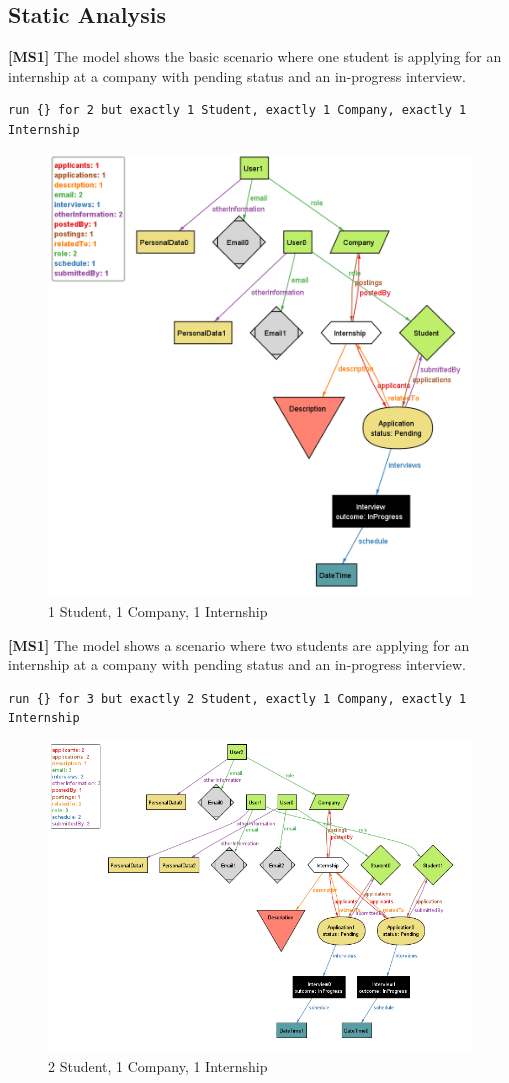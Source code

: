 \subsection{Static Analysis}
\textbf{[MS1]} The model shows the basic scenario where one student is applying for an internship at a company with pending status and an in-progress interview.
\begin{lstlisting}
run {} for 2 but exactly 1 Student, exactly 1 Company, exactly 1  Internship
\end{lstlisting}
\begin{figure}[H]
    \centering
    \includegraphics[width=0.75\linewidth]{RASD//Images/1st1com.png}
    \caption{1 Student, 1 Company, 1 Internship}
    \label{fig:enter-label}
\end{figure}

\textbf{[MS1]} The model shows a scenario where two students are applying for an internship at a company with pending status and an in-progress interview.
\begin{lstlisting}
run {} for 3 but exactly 2 Student, exactly 1 Company, exactly 1  Internship
\end{lstlisting}
\begin{figure}[H]
    \centering
    \includegraphics[width=0.75\linewidth]{RASD//Images/2st1com.png}
    \caption{2 Student, 1 Company, 1 Internship}
    \label{fig:enter-label}
\end{figure}

